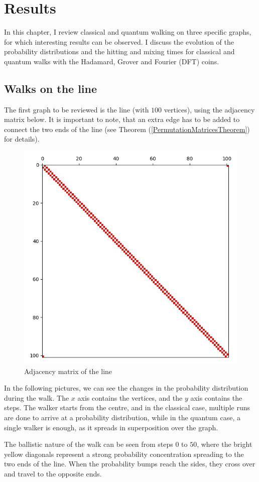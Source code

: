 \section{Results}

In this chapter, I review classical and quantum walking on three specific graphs, for which interesting results can be observed. I discuss the evolution of the probability distributions and the hitting and mixing times for classical and quantum walks with the Hadamard, Grover and Fourier (DFT) coins.

\subsection{Walks on the line}

The first graph to be reviewed is the line (with $100$ vertices), using the adjacency matrix below. It is important to note, that an extra edge has to be added to connect the two ends of the line (see Theorem (\ref{PermutationMatricesTheorem}) for details).

\begin{figure}[H]
\centering
\includegraphics[width=0.5\linewidth]{./figures/results/path/graph.jpg}
\caption{Adjacency matrix of the line}
\end{figure}

In the following pictures, we can see the changes in the probability distribution during the walk. The $x$ axis contains the vertices, and the $y$ axis contains the steps. The walker starts from the centre, and in the classical case, multiple runs are done to arrive at a probability distribution, while in the quantum case, a single walker is enough, as it spreads in superposition over the graph.

The ballistic nature of the walk can be seen from steps $0$ to $50$, where the bright yellow diagonals represent a strong probability concentration spreading to the two ends of the line. When the probability bumps reach the sides, they cross over and travel to the opposite ends.


